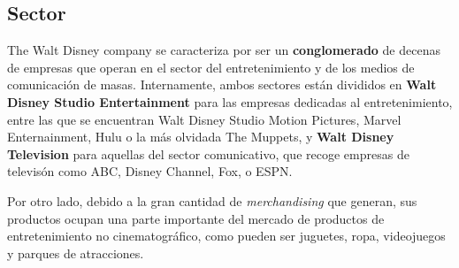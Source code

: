 \subsection{Sector}

The Walt Disney company se caracteriza por ser un \textbf{conglomerado} de decenas de empresas que operan en el sector del entretenimiento y de los medios de comunicación de masas. Internamente, ambos sectores están divididos en \textbf{Walt Disney Studio Entertainment} para las empresas dedicadas al entretenimiento, entre las que se encuentran Walt Disney Studio Motion Pictures, Marvel Enternainment, Hulu o la más olvidada The Muppets, y \textbf{Walt Disney Television} para aquellas del sector comunicativo, que recoge empresas de televisón como ABC, Disney Channel, Fox, o ESPN.

Por otro lado, debido a la gran cantidad de \textit{merchandising} que generan, sus productos ocupan una parte importante del mercado de productos de entretenimiento no cinematográfico, como pueden ser juguetes, ropa, videojuegos y parques de atracciones.